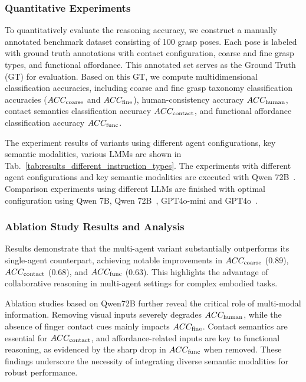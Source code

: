 \subsubsection{Quantitative Experiments}

To quantitatively evaluate the reasoning accuracy, we construct a manually annotated benchmark dataset consisting of 100 grasp poses. Each pose is labeled with ground truth annotations with contact configuration, coarse and fine grasp types, and functional affordance. 
This annotated set serves as the Ground Truth (GT) for evaluation. Based on this GT, we compute multidimensional classification accuracies, including coarse and fine grasp taxonomy classification accuracies ($ACC_{\rm coarse}$ and $ACC_{\rm fine}$), human-consistency accuracy $ACC_{\rm human}$, contact semantics classification accuracy $ACC_{\rm contact}$, and functional affordance classification accuracy $ACC_{\rm func}$. 

The experiment results of variants using different agent configurations, key semantic modalities, various LMMs are shown in Tab.~\ref{tab:results_different_instruction_types}. The experiments with different agent configurations and key semantic modalities are executed with Qwen 72B~\cite{bai2025qwen2}. Comparison experiments using different LLMs are finished with optimal configuration using Qwen 7B, Qwen 72B~\cite{bai2025qwen2}, GPT4o-mini and GPT4o~\cite{hurst2024gpt}.


\subsubsection{Ablation Study Results and Analysis}
Results demonstrate that the multi-agent variant substantially outperforms its single-agent counterpart, achieving notable improvements in $ACC_{\rm coarse}$ (0.89), $ACC_{\rm contact}$ (0.68), and $ACC_{\rm func}$ (0.63). This highlights the advantage of collaborative reasoning in multi-agent settings for complex embodied tasks.

Ablation studies based on Qwen72B further reveal the critical role of multi-modal information. Removing visual inputs severely degrades $ACC_{\rm human}$, while the absence of finger contact cues mainly impacts $ACC_{\rm fine}$. Contact semantics are essential for $ACC_{\rm contact}$, and affordance-related inputs are key to functional reasoning, as evidenced by the sharp drop in $ACC_{\rm func}$ when removed. These findings underscore the necessity of integrating diverse semantic modalities for robust performance.

